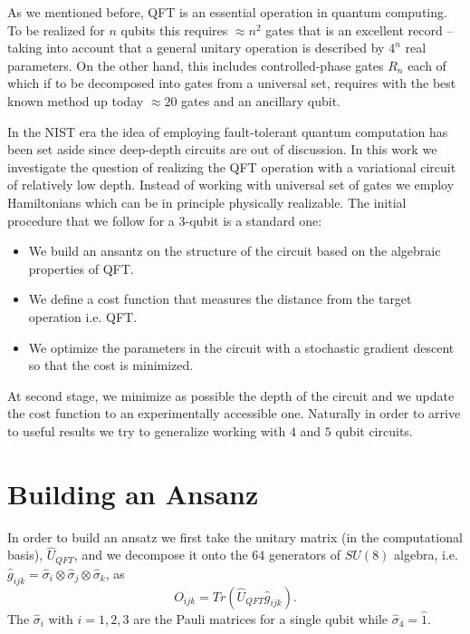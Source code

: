 \documentclass[inscr,ack,preface]{diphdthesis}
\begin{document}
\label{sec:qft_vqc}


As we mentioned before, QFT is an essential operation in quantum computing. To be realized for $n$ qubits this requires 
$\approx n^2$ gates that is an excellent record --taking into account that a general unitary operation
is described by $4^n$ real parameters. On the other hand, this includes controlled-phase gates $R_n$
each of which if to be decomposed into gates from a universal set, requires with the best known
method up today $\approx 20$ gates and an ancillary qubit. 

In the NIST era the idea of employing fault-tolerant quantum computation has been set aside
since deep-depth circuits are out of discussion. In this work we investigate the question
of realizing the QFT operation with a variational circuit of relatively low depth. Instead of
working with universal set of gates we employ Hamiltonians which can be in principle physically realizable.
 The initial procedure that we follow for a $3$-qubit is a standard one:
\begin{itemize}
	\item We build an ansantz on the structure of the circuit based on the algebraic properties of QFT.
	\item We define a cost function that measures the distance from the target operation i.e. QFT.
	\item We optimize the parameters in the circuit with a stochastic gradient descent so that the cost is minimized. 
\end{itemize}
At second stage, we minimize as possible the depth of the circuit and we update the cost function to an experimentally accessible one.
Naturally in order to arrive to useful results we try to generalize working with $4$ and $5$ qubit circuits.
  
\section{Building an Ansanz} 

In order to build an ansatz we first take the unitary matrix (in the computational basis), $\hat{U}_{QFT}$,
and we decompose it onto the $64$ generators of $SU(8)$ algebra, i.e. $\hat{g}_{ijk}=\hat{\sigma}_{i} \otimes \hat{\sigma}_{j} \otimes \hat{\sigma}_{k}$,
as 
\begin{equation}
O_{ijk}=Tr\left(\hat{U}_{QFT} \hat{g}_{ijk} \right).
\end{equation}
The $\hat{\sigma}_{i}$ with $i=1,2,3$ are the Pauli matrices for a single qubit while $\hat{\sigma}_{4}=\hat{1}$.
\end{document}
